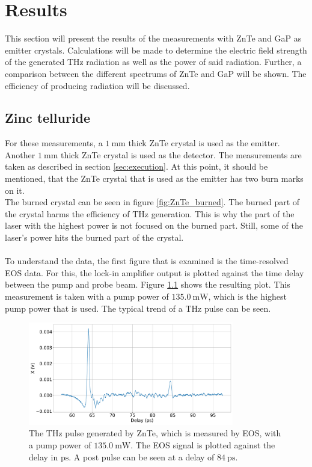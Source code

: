 \chapter{Results}
This section will present the results of the measurements with ZnTe and GaP as emitter crystals.
Calculations will be made to determine the electric field strength of the generated $\si{\tera\hertz}$ radiation as well as the power of said radiation.
Further, a comparison between the different spectrums of ZnTe and GaP will be shown.
The efficiency of producing radiation will be discussed.

\section{Zinc telluride}
For these measurements, a $\SI{1}{\milli\meter}$ thick ZnTe crystal is used as the emitter.
Another $\SI{1}{\milli\meter}$ thick ZnTe crystal is used as the detector.
The measurements are taken as described in section \ref{sec:execution}.
At this point, it should be mentioned, that the ZnTe crystal that is used as the emitter has two burn marks on it.
\\
The burned crystal can be seen in figure \ref{fig:ZnTe_burned}.
The burned part of the crystal harms the efficiency of $\si{\tera\hertz}$ generation.
This is why the part of the laser with the highest power is not focused on the burned part.
Still, some of the laser's power hits the burned part of the crystal.
\\\\
To understand the data, the first figure that is examined is the time-resolved EOS data.
For this, the lock-in amplifier output is plotted against the time delay between the pump and probe beam.
Figure \ref{ZnTe:2_11_30_20_signal} shows the resulting plot.
This measurement is taken with a pump power of $\SI{135.0}{\milli\W}$, which is the highest pump power that is used.
The typical trend of a $\si{\tera\hertz}$ pulse can be seen.
\begin{figure}
    \centering
    \includegraphics[width=0.8\textwidth]{Plots/2_11_30_20normalX.pdf}
    \caption{The $\si{\tera\hertz}$ pulse generated by ZnTe, which is measured by EOS, with a pump power of $\SI{135.0}{\milli\W}$.
    The EOS signal is plotted against the delay in $\si{\pico\second}$.
    A post pulse can be seen at a delay of $\SI{84}{\pico\second}$.}
    \label{ZnTe:2_11_30_20_signal}
\end{figure}
